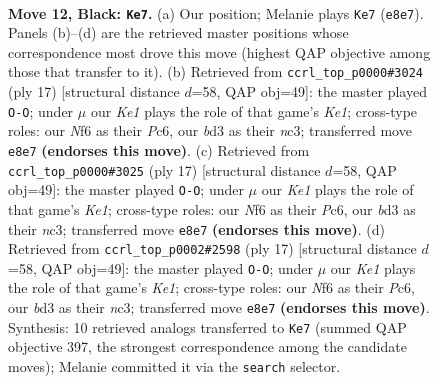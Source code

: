 \documentclass[11pt]{article}
\begin{document}
\clearpage

\begin{figure}[p]\centering
\begin{subfigure}{0.46\textwidth}\centering
\resizebox{\linewidth}{!}{%
\newchessgame
\chessboard[
  setfen={r1bqk2r/p2n1ppp/2pbpn2/8/Np1P3N/3BP3/PP3PPP/R1BQ1RK1 b - - 5 12},
  showmover=false,
  pgfstyle=straightmove, color=movearrow, markmove={e8-e7}
]}
\caption{}
\end{subfigure}\hfill
\begin{subfigure}{0.46\textwidth}\centering
\resizebox{\linewidth}{!}{%
\newchessgame
\chessboard[
  setfen={r1bqk2r/p2n1ppp/2pbpn2/1p6/3P4/2NBPN2/PP3PPP/R1BQ1RK1 b kq - 3 9},
  showmover=false,
  pgfstyle=straightmove, color=movearrow, markmove={e8-g8}
]}
\caption{}
\end{subfigure}
\\[4pt]
\begin{subfigure}{0.46\textwidth}\centering
\resizebox{\linewidth}{!}{%
\newchessgame
\chessboard[
  setfen={r1bqk2r/p2n1ppp/2pbpn2/1p6/3P4/2NBPN2/PP3PPP/R1BQ1RK1 b kq - 3 9},
  showmover=false,
  pgfstyle=straightmove, color=movearrow, markmove={e8-g8}
]}
\caption{}
\end{subfigure}\hfill
\begin{subfigure}{0.46\textwidth}\centering
\resizebox{\linewidth}{!}{%
\newchessgame
\chessboard[
  setfen={r1bqk2r/p2n1ppp/2pbpn2/1p6/3P4/2NBPN2/PP3PPP/R1BQ1RK1 b kq - 3 9},
  showmover=false,
  pgfstyle=straightmove, color=movearrow, markmove={e8-g8}
]}
\caption{}
\end{subfigure}
\caption{\textbf{Move 12, Black: \texttt{Ke7}.} (a) Our position; Melanie plays \texttt{Ke7} (\texttt{e8e7}). Panels (b)--(d) are the retrieved master positions whose correspondence most drove this move (highest QAP objective among those that transfer to it). (b) Retrieved from \texttt{ccrl\_top\_p0000\#3024} (ply 17) [structural distance $d$=58, QAP obj=49]: the master played \texttt{O-O}; under $\mu$ our \emph{Ke1} plays the role of that game's \emph{Ke1}; cross-type roles: our \emph{N}f6 as their \emph{P}c6, our \emph{b}d3 as their \emph{n}c3; transferred move \texttt{e8e7} \textbf{(endorses this move)}. (c) Retrieved from \texttt{ccrl\_top\_p0000\#3025} (ply 17) [structural distance $d$=58, QAP obj=49]: the master played \texttt{O-O}; under $\mu$ our \emph{Ke1} plays the role of that game's \emph{Ke1}; cross-type roles: our \emph{N}f6 as their \emph{P}c6, our \emph{b}d3 as their \emph{n}c3; transferred move \texttt{e8e7} \textbf{(endorses this move)}. (d) Retrieved from \texttt{ccrl\_top\_p0002\#2598} (ply 17) [structural distance $d$=58, QAP obj=49]: the master played \texttt{O-O}; under $\mu$ our \emph{Ke1} plays the role of that game's \emph{Ke1}; cross-type roles: our \emph{N}f6 as their \emph{P}c6, our \emph{b}d3 as their \emph{n}c3; transferred move \texttt{e8e7} \textbf{(endorses this move)}. Synthesis: 10 retrieved analogs transferred to \texttt{Ke7} (summed QAP objective 397, the strongest correspondence among the candidate moves); Melanie committed it via the \texttt{search} selector.}
\label{fig:thought-m23}
\end{figure}
\end{document}
